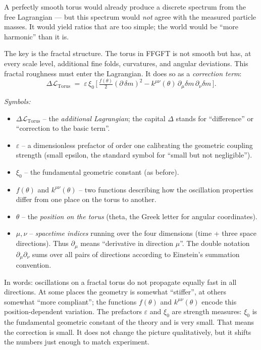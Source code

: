 A perfectly smooth torus would already produce a discrete spectrum
from the free Lagrangian --- but this spectrum would \emph{not} agree
with the measured particle masses. It would yield ratios that are
too simple; the world would be \enquote{more harmonic} than it is.

The key is the fractal structure. The torus in FFGFT is not smooth
but has, at every scale level, additional fine folds, curvatures,
and angular deviations. This fractal roughness must enter the
Lagrangian. It does so as a \emph{correction term}:
\[
  \Delta\mathcal{L}_{\text{Torus}}
  \;=\; \varepsilon\,\xi_0\,
        \bigl[\, \tfrac{f(\theta)}{2}(\partial\,\delta m)^2
              - k^{\mu\nu}(\theta)\,\partial_\mu\delta m\,\partial_\nu\delta m \,\bigr].
\]

\noindent\textit{Symbols:}
\begin{itemize}\setlength\itemsep{0pt}
  \item $\Delta\mathcal{L}_{\text{Torus}}$ -- the \emph{additional
        Lagrangian}; the capital $\Delta$ stands for
        \enquote{difference} or \enquote{correction to the basic term}.
  \item $\varepsilon$ -- a dimensionless prefactor of order one
        calibrating the geometric coupling strength (small epsilon,
        the standard symbol for \enquote{small but not negligible}).
  \item $\xi_0$ -- the fundamental geometric constant (as before).
  \item $f(\theta)$ and $k^{\mu\nu}(\theta)$ -- two functions
        describing how the oscillation properties differ from one
        place on the torus to another.
  \item $\theta$ -- the \emph{position on the torus} (theta, the Greek
        letter for angular coordinates).
  \item $\mu, \nu$ -- \emph{spacetime indices} running over the four
        dimensions (time + three space directions). Thus $\partial_\mu$
        means \enquote{derivative in direction $\mu$}. The double
        notation $\partial_\mu\partial_\nu$ sums over all pairs of
        directions according to Einstein's summation convention.
\end{itemize}

\medskip\noindent
In words: oscillations on a fractal torus do not propagate equally
fast in all directions. At some places the geometry is somewhat
\enquote{stiffer}, at others somewhat \enquote{more compliant}; the
functions $f(\theta)$ and $k^{\mu\nu}(\theta)$ encode this
position-dependent variation. The prefactors $\varepsilon$ and
$\xi_0$ are strength measures: $\xi_0$ is the fundamental geometric
constant of the theory and is very small. That means the correction
is small. It does not change the picture qualitatively, but it
shifts the numbers just enough to match experiment.

